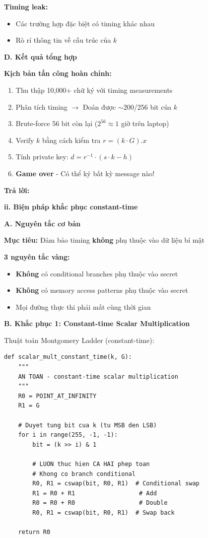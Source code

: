 \textbf{Timing leak:}
\begin{itemize}
    \item Các trường hợp đặc biệt có timing khác nhau
    \item Rò rỉ thông tin về cấu trúc của $k$
\end{itemize}
\textbf{D. Kết quả tổng hợp}

\textbf{Kịch bản tấn công hoàn chỉnh:}

\begin{enumerate}
    \item Thu thập 10,000+ chữ ký với timing measurements
    \item Phân tích timing $\rightarrow$ Đoán được $\sim$200/256 bit của $k$
    \item Brute-force 56 bit còn lại ($2^{56} \approx 1$ giờ trên laptop)
    \item Verify $k$ bằng cách kiểm tra $r = (k \cdot G).x$
    \item Tính private key: $d = r^{-1} \cdot (s \cdot k - h)$
    \item \textbf{Game over} - Có thể ký bất kỳ message nào!
\end{enumerate}

\begin{center}
    \textbf{Trả lời:}
\end{center}

\textbf{ii. Biện pháp khắc phục constant-time}

\textbf{A. Nguyên tắc cơ bản}

\textbf{Mục tiêu:} Đảm bảo timing \textbf{không} phụ thuộc vào dữ liệu bí mật

\textbf{3 nguyên tắc vàng:}
\begin{itemize}
    \item \textbf{Không} có conditional branches phụ thuộc vào secret
    \item \textbf{Không} có memory access patterns phụ thuộc vào secret
    \item Mọi đường thực thi phải mất cùng thời gian
\end{itemize}

\textbf{B. Khắc phục 1: Constant-time Scalar Multiplication}

Thuật toán Montgomery Ladder (constant-time):

\begin{verbatim}
def scalar_mult_constant_time(k, G):
    """
    AN TOAN - constant-time scalar multiplication
    """
    R0 = POINT_AT_INFINITY
    R1 = G
    
    # Duyet tung bit cua k (tu MSB den LSB)
    for i in range(255, -1, -1):
        bit = (k >> i) & 1
        
        # LUON thuc hien CA HAI phep toan
        # Khong co branch conditional
        R0, R1 = cswap(bit, R0, R1)  # Conditional swap
        R1 = R0 + R1                  # Add
        R0 = R0 + R0                  # Double
        R0, R1 = cswap(bit, R0, R1)  # Swap back
    
    return R0
\end{verbatim}

